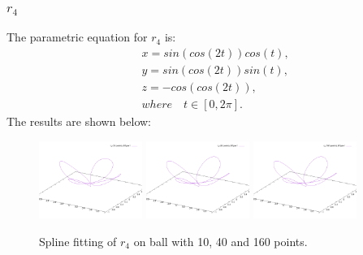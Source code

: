 \documentclass{article}
\begin{document}
\subsubsection{\(r_4\)}
The parametric equation for \(r_4\) is:
\begin{align*}
&x = sin(cos(2t))cos(t),\\
&y = sin(cos(2t))sin(t),\\
&z = -cos(cos(2t)),\\
&where \quad t \in [0, 2\pi].    
\end{align*}
The results are shown below:
\begin{figure}[H]
    \centering
    \includegraphics[width=0.3\textwidth]{../figure/B1r4spline_ball_10.png}
    \includegraphics[width=0.3\textwidth]{../figure/B1r4spline_ball_40.png}
    \includegraphics[width=0.3\textwidth]{../figure/B1r4spline_ball_160.png}
    \caption{Spline fitting of \(r_4\) on ball with 10, 40 and 160 points.}
    \label{fig:ball2}
\end{figure}
\end{document}

